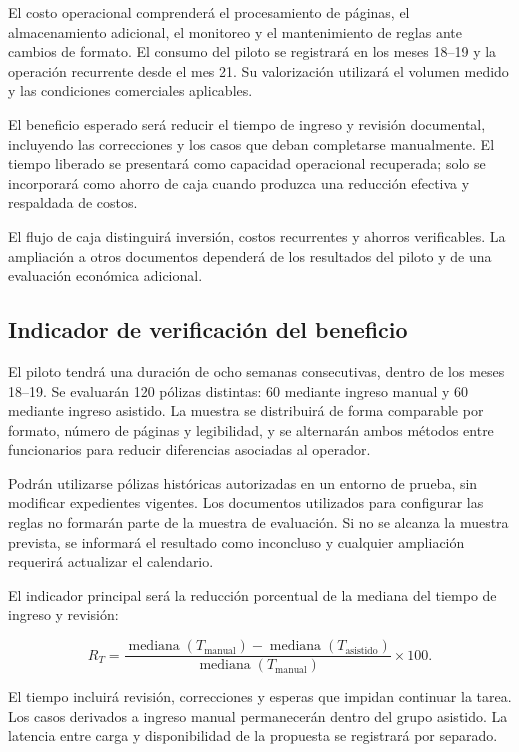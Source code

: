 El costo operacional comprenderá el procesamiento de páginas,
el almacenamiento adicional, el monitoreo y el mantenimiento
de reglas ante cambios de formato. El consumo del piloto se
registrará en los meses 18--19 y la operación recurrente desde
el mes 21. Su valorización utilizará el volumen medido y las
condiciones comerciales aplicables.

El beneficio esperado será reducir el tiempo de ingreso y
revisión documental, incluyendo las correcciones y los casos
que deban completarse manualmente. El tiempo liberado se
presentará como capacidad operacional recuperada; solo se
incorporará como ahorro de caja cuando produzca una reducción
efectiva y respaldada de costos.

El flujo de caja distinguirá inversión, costos recurrentes
y ahorros verificables. La ampliación a otros documentos
dependerá de los resultados del piloto y de una evaluación
económica adicional.


\subsection{Indicador de verificación del beneficio}

El piloto tendrá una duración de ocho semanas consecutivas,
dentro de los meses 18--19. Se evaluarán 120 pólizas distintas:
60 mediante ingreso manual y 60 mediante ingreso asistido.
La muestra se distribuirá de forma comparable por formato,
número de páginas y legibilidad, y se alternarán ambos métodos
entre funcionarios para reducir diferencias asociadas al operador.

Podrán utilizarse pólizas históricas autorizadas en un entorno
de prueba, sin modificar expedientes vigentes. Los documentos
utilizados para configurar las reglas no formarán parte de la
muestra de evaluación. Si no se alcanza la muestra prevista,
se informará el resultado como inconcluso y cualquier ampliación
requerirá actualizar el calendario.

El indicador principal será la reducción porcentual de la
mediana del tiempo de ingreso y revisión:

\[
R_T =
\frac{
\operatorname{mediana}(T_{\mathrm{manual}})
-
\operatorname{mediana}(T_{\mathrm{asistido}})
}{
\operatorname{mediana}(T_{\mathrm{manual}})
}
\times 100.
\]

El tiempo incluirá revisión, correcciones y esperas que impidan
continuar la tarea. Los casos derivados a ingreso manual
permanecerán dentro del grupo asistido. La latencia entre carga
y disponibilidad de la propuesta se registrará por separado.


